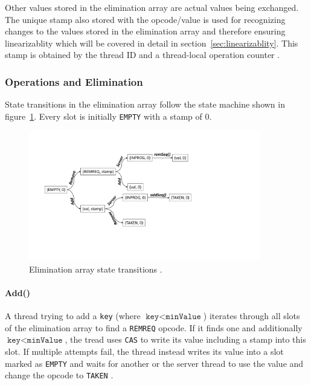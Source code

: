 Other values stored in the elimination array are actual values being exchanged. The unique stamp also stored with the opcode/value is used for recognizing changes to the values stored in the elimination array and therefore ensuring linearizablity which will be covered in detail in section~\ref{sec:linearizablity}. This stamp is obtained by the thread ID and a thread-local operation counter \cite{calciu_adaptive_2014}.

\subsubsection{Operations and Elimination}

State transitions in the elimination array follow the state machine shown in figure~\ref{fig:combining-state}. Every slot is initially \texttt{EMPTY} with a stamp of 0. 

\begin{figure}[htb]
	\centering
	\includegraphics[width=0.9\textwidth]{graphics/combining-state.pdf}
	\caption{Elimination array state transitions \cite{calciu_adaptive_2014}.}
	\label{fig:combining-state}
\end{figure}

\paragraph{Add()} A thread trying to add a \texttt{key} (where $\texttt{key} < \texttt{minValue}$) iterates through all slots of the elimination array to find a \texttt{REMREQ} opcode. If it finds one and additionally $\texttt{key} < \texttt{minValue}$, the tread uses \texttt{CAS} to write its value including a stamp into this slot. If multiple attempts fail, the thread instead writes its value into a slot marked as \texttt{EMPTY} and waits for another or the server thread to use the value and change the opcode to \texttt{TAKEN} \cite{calciu_adaptive_2014}.

